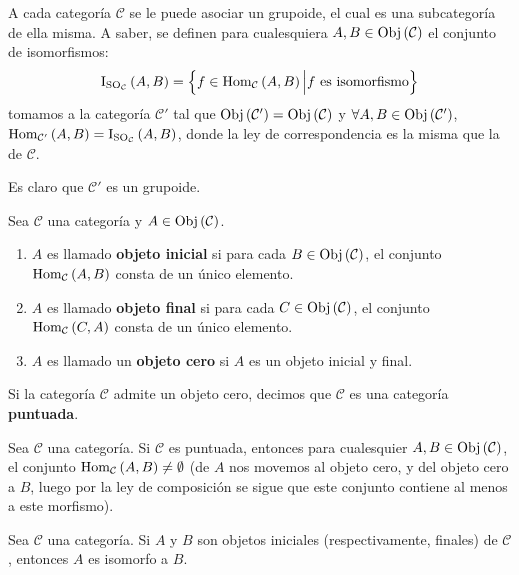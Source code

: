 \documentclass[12pt]{report}
\theoremstyle{largebreak}
\newcommand{\Obj}[1]{\ensuremath{\textup{Obj}\left(#1\right)}}
\newcommand{\Hom}[3]{\ensuremath{\textup{Hom}_{#1}\left(#2,#3\right)}}
\newcommand{\Iso}[3]{\ensuremath{\textup{I}_{\textup{SO}_{#1}}\left(#2,#3\right)}}
\begin{document}
    \begin{exa}
        A cada categoría $\mathcal{C}$ se le puede asociar un grupoide, el cual es una subcategoría de ella misma. A saber, se definen para cualesquiera $A,B\in\Obj{\mathcal{C}}$ el conjunto de isomorfismos:
        \begin{equation*}
            \Iso{\mathcal{C}}{A}{B}=\left\{f\in\Hom{\mathcal{C}}{A}{B}\Big| f\textup{ es isomorfismo} \right\}
        \end{equation*}
        tomamos a la categoría $\mathcal{C}'$ tal que $\Obj{\mathcal{C}'}=\Obj{\mathcal{C}}$ y $\forall A,B\in\Obj{\mathcal{C}'}$, $\Hom{\mathcal{C}'}{A}{B}=\Iso{\mathcal{C}}{A}{B}$, donde la ley de correspondencia es la misma que la de $\mathcal{C}$.

        Es claro que $\mathcal{C}'$ es un grupoide.
    \end{exa}

    \begin{mydef}
        Sea $\mathcal{C}$ una categoría y $A\in\Obj{\mathcal{C}}$.
        \begin{enumerate}
            \item $A$ es llamado \textbf{objeto inicial} si para cada $B\in\Obj{\mathcal{C}}$, el conjunto $\Hom{\mathcal{C}}{A}{B}$ consta de un único elemento.
            \item $A$ es llamado \textbf{objeto final} si para cada $C\in\Obj{\mathcal{C}}$, el conjunto $\Hom{\mathcal{C}}{C}{A}$ consta de un único elemento.
            \item $A$ es llamado un \textbf{objeto cero} si $A$ es un objeto inicial y final.
        \end{enumerate}
        Si la categoría $\mathcal{C}$ admite un objeto cero, decimos que $\mathcal{C}$ es una categoría \textbf{puntuada}.
    \end{mydef}

    \begin{obs}
        Sea $\mathcal{C}$ una categoría. Si $\mathcal{C}$ es puntuada, entonces para cualesquier $A,B\in\Obj{\mathcal{C}}$, el conjunto $\Hom{\mathcal{C}}{A}{B}\neq\emptyset$ (de $A$ nos movemos al objeto cero, y del objeto cero a $B$, luego por la ley de composición se sigue que este conjunto contiene al menos a este morfismo).
    \end{obs}

    \begin{propo}
        Sea $\mathcal{C}$ una categoría. Si $A$ y $B$ son objetos iniciales (respectivamente, finales) de $\mathcal{C}$, entonces $A$ es isomorfo a $B$.
    \end{propo}
\end{document}
